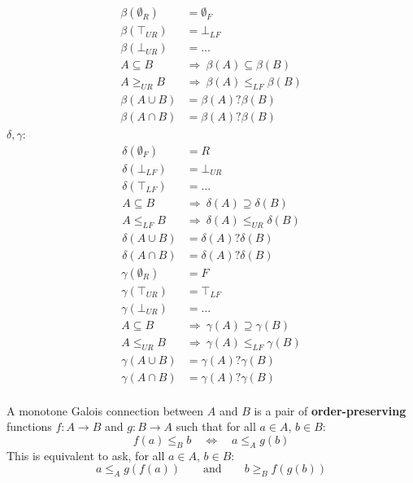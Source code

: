 \begin{align}
    \beta(\emptyset_{R}) &= \emptyset_{F} \\
    \beta(\top_{UR}) &= \bot_{LF} \\
    \beta(\bot_{UR}) &= ... \\
    A \subseteq B \ &\Rightarrow\ \beta(A) \subseteq \beta(B)     \\
    A \geq_{UR} B \ &\Rightarrow\ \beta(A) \leq_{LF} \beta(B) \label{eq:1} \\
    \beta(A \cup B) &= \beta(A) ? \beta(B) \\
    \beta(A \cap B) &= \beta(A) ? \beta(B)
\end{align}
$\delta, \gamma$:
\begin{align}
\delta(\emptyset_F) &= R  \\
    \delta(\bot_{LF}) &= \bot_{UR}  \\
    \delta(\top_{LF}) &= ... \\
    A \subseteq B \ &\Rightarrow\ \delta(A) \supseteq \delta(B)\\
    A \leq_{LF} B \ &\Rightarrow\ \delta(A) \leq_{UR} \delta(B)
    \\
    \delta(A \cup B) &= \delta(A) ? \delta(B) \\
    \delta(A \cap B) &= \delta(A) ? \delta(B)
\end{align}
\begin{align}
   \gamma(\emptyset_R) &= F \\
    \gamma(\top_{UR}) &= \top_{LF} \\
    \gamma(\bot_{UR}) &= ... \\
    A \subseteq B \ & \Rightarrow\ \gamma(A) \supseteq \gamma(B) \\
    A \leq_{UR} B \ & \Rightarrow\ \gamma(A) \leq_{LF} \gamma(B) \\
    \gamma(A \cup B) &= \gamma(A) ? \gamma(B) \\
    \gamma(A \cap B) &= \gamma(A) ? \gamma(B) \\
\end{align}


\begin{definition}
A monotone Galois connection between $A$ and $B$ is a pair of \textbf{order-preserving} functions $f:A\to B$ and $g:B\to A$ such that for all $a\in A$, $b\in B$:
\begin{equation}
    f(a) \leq_B b \quad \Leftrightarrow \quad a \leq_A g(b)
\end{equation}
This is equivalent to ask, for all $a\in A$, $b\in B$:
\begin{equation}
    a\leq_A g(f(a)) \qquad \text{and} \qquad b\geq_{B}f(g(b))
\end{equation}
\end{definition}



